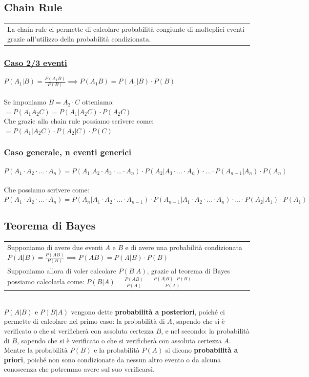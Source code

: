 \documentclass{article}
\begin{document}
\subsection{Chain Rule}
\begin{tabular}{|p{13cm}}
La chain rule ci permette di calcolare probabilità congiunte di molteplici eventi grazie all’utilizzo della probabilità condizionata.
\end{tabular}
\subsubsection{\underline{Caso 2/3 eventi}}
$P(A_1|B) = \frac{P(A_1 B)}{P(B)} \implies P(A_1B) = P(A_1 | B) \cdot P(B)$ \\ \\
Se imponiamo $B = A_2 \cdot C$ otteniamo: \\
$= P(A_1A_2C) = P(A_1 |A_2 C) \cdot P(A_2 C)$ \\
Che grazie alla chain rule possiamo scrivere come: \\
$= P(A_1 |A_2 C) \cdot P(A_2 |C) \cdot P(C)$
\subsubsection{\underline{Caso generale, n eventi generici}}
$P(A_1 \cdot A_2 \cdot \dots \cdot A_n) = P(A_1|A_2 \cdot A_3 \cdot \dots \cdot A_n) \cdot P(A_2|A_3 \cdot \dots \cdot A_n) \cdot \dots \cdot P(A_{n-1}| A_n) \cdot P(A_n)$ \\ \\
Che possiamo scrivere come: \\
$P(A_1 \cdot A_2 \cdot \dots \cdot A_n) = P(A_n|A_1 \cdot A_2 \cdot \dots \cdot A_{n-1}) \cdot P(A_{n-1}|A_1 \cdot A_2 \cdot \dots \cdot A_n) \cdot \dots \cdot P(A_2| A_1) \cdot P(A_1)$

\subsection{Teorema di Bayes}
\begin{tabular}{|p{13cm}}
Supponiamo di avere due eventi $A$ e $B$ e di avere una probabilità condizionata $P(A|B) = \frac{P(AB)}{P(B)} \implies P(AB) = P(A|B) \cdot P(B)$ \\
Supponiamo allora di voler calcolare $P(B|A)$, grazie al teorema di Bayes possiamo calcolarla come: $P(B|A) = \frac{P(AB)}{P(A)} = \frac{P(A|B) \cdot P(B)}{P(A)}$ 
\end{tabular} \\
$P(A|B)$ e $P(B|A)$ vengono dette \textbf{probabilità a posteriori}, poiché ci permette di calcolare nel primo caso: la probabilità di $A$, sapendo che si è verificato o che si verificherà con assoluta certezza $B$, e nel secondo: la probabilità di $B$, sapendo che si è verificato o che si verificherà con assoluta certezza $A$. \\
Mentre la probabilità $P(B)$ e la probabilità $P(A)$ si dicono \textbf{probabilità a priori}, poiché non sono condizionate da nessun altro evento o da alcuna conoscenza che potremmo avere sul suo verificarsi. 
\end{document}

